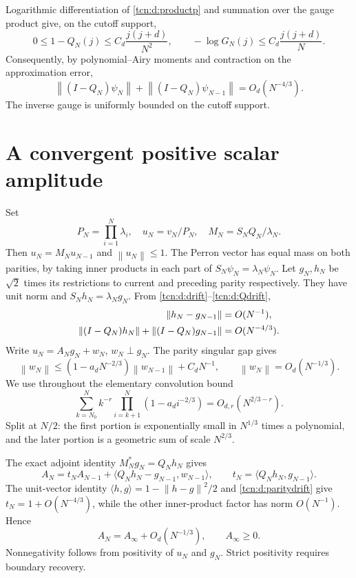 \documentclass[11pt,letterpaper]{article}
\newcommand{\norm}[1]{\left\lVert#1\right\rVert}
\newcommand{\ip}[2]{\langle#1,#2\rangle}
\theoremstyle{remark}
\begin{document}
Logarithmic differentiation of \eqref{tcn:d:productp} and summation over the gauge product give, on the cutoff support,
\[
 0\le1-Q_N(j)\le C_d\frac{j(j+d)}{N^2},\qquad
 -\log G_N(j)\le C_d\frac{j(j+d)}N.
\]
Consequently, by polynomial--Airy moments and contraction on the approximation error,
\begin{equation}\label{tcn:d:Qdrift}
 \norm{(I-Q_N)\psi_N}+\norm{(I-Q_N)\psi_{N-1}}=O_d(N^{-4/3}).
\end{equation}
The inverse gauge is uniformly bounded on the cutoff support.

\section{A convergent positive scalar amplitude}\label{tcn:d:sec:amplitude}
Set
\[
 P_N=\prod_{i=1}^N\lambda_i,\quad u_N=v_N/P_N,\quad
 M_N=S_NQ_N/\lambda_N.
\]
Then $u_N=M_Nu_{N-1}$ and $\norm{u_N}\le1$. The Perron vector has equal mass on both parities, by taking inner products in each part of $S_N\psi_N=\lambda_N\psi_N$. Let $g_N,h_N$ be $\sqrt2$ times its restrictions to current and preceding parity respectively. They have unit norm and $S_Nh_N=\lambda_Ng_N$. From \eqref{tcn:d:drift}--\eqref{tcn:d:Qdrift},
\begin{align}
 \norm{h_N-g_{N-1}}&=O(N^{-1}),\notag\\
 \norm{(I-Q_N)h_N}+\norm{(I-Q_N)g_{N-1}}&=O(N^{-4/3}).\label{tcn:d:paritydrift}
\end{align}
Write $u_N=A_Ng_N+w_N$, $w_N\perp g_N$. The parity singular gap gives
\[
 \norm{w_N}\le(1-a_dN^{-2/3})\norm{w_{N-1}}+C_dN^{-1},
 \qquad \norm{w_N}=O_d(N^{-1/3}).
\]
We use throughout the elementary convolution bound
\begin{equation}\label{tcn:d:conv}
 \sum_{k=N_0}^N k^{-r}\prod_{i=k+1}^N(1-a_di^{-2/3})
 =O_{d,r}(N^{2/3-r}).
\end{equation}
Split at $N/2$: the first portion is exponentially small in $N^{1/3}$ times a polynomial, and the later portion is a geometric sum of scale $N^{2/3}$.

The exact adjoint identity $M_N^*g_N=Q_Nh_N$ gives
\[
 A_N=t_NA_{N-1}+\ip{Q_Nh_N-g_{N-1}}{w_{N-1}},\qquad
 t_N=\ip{Q_Nh_N}{g_{N-1}}.
\]
The unit-vector identity $\ip hg=1-\norm{h-g}^2/2$ and \eqref{tcn:d:paritydrift} give $t_N=1+O(N^{-4/3})$, while the other inner-product factor has norm $O(N^{-1})$. Hence
\begin{equation}\label{tcn:d:Alimit}
 A_N=A_\infty+O_d(N^{-1/3}),\qquad A_\infty\ge0.
\end{equation}
Nonnegativity follows from positivity of $u_N$ and $g_N$. Strict positivity requires boundary recovery.
\end{document}
